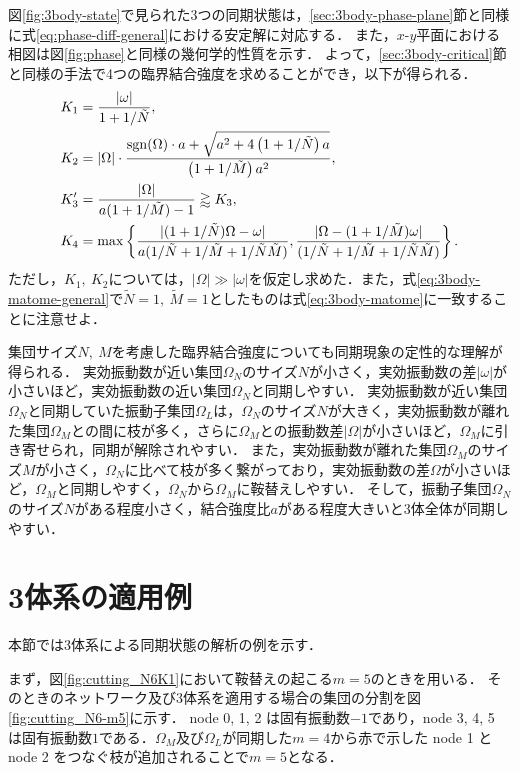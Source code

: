 \documentclass[../main]{subfiles}
\begin{document}
図\ref{fig:3body-state}で見られた3つの同期状態は，\ref{sec:3body-phase-plane}節と同様に式\eqref{eq:phase-diff-general}における安定解に対応する．
また，$x$-$y$平面における相図は図\ref{fig:phase}と同様の幾何学的性質を示す．
よって，\ref{sec:3body-critical}節と同様の手法で4つの臨界結合強度を求めることができ，以下が得られる．
\begin{align}
    \label{eq:3body-matome-general}
    \begin{split}
        K_1&=\frac{|\omega|}{1+1/\tilde{N}},\\
        K_2&=|\Omega|\cdot\frac{\operatorname{sgn}(\Omega) \cdot a+\sqrt{a^2+4\left(1+1/\tilde{N}\right)a}}{\left(1+1/\tilde{M}\right)a^2},\\
        K'_3&=\frac{|\Omega|}{a(1+1/\tilde{M})-1}\gtrapprox K_3,\\
        K_4&=\max\left\{\frac{|(1+1/\tilde{N})\Omega-\omega|}{a(1/\tilde{N}+1/\tilde{M}+1/\tilde{N}\tilde{M})},\frac{|\Omega-(1+1/\tilde{M})\omega|}{(1/\tilde{N}+1/\tilde{M}+1/\tilde{N}\tilde{M})}\right\}.
    \end{split}
\end{align}
ただし，$K_1,\ K_2$については，$|\Omega|\gg|\omega|$を仮定し求めた．また，式\eqref{eq:3body-matome-general}で$\tilde{N}=1,\ \tilde{M}=1$としたものは式\eqref{eq:3body-matome}に一致することに注意せよ．

集団サイズ$N,\ M$を考慮した臨界結合強度についても同期現象の定性的な理解が得られる．
実効振動数が近い集団$\Omega_N$のサイズ$N$が小さく，実効振動数の差$|\omega|$が小さいほど，実効振動数の近い集団$\Omega_N$と同期しやすい．
実効振動数が近い集団$\Omega_N$と同期していた振動子集団$\Omega_L$は，$\Omega_N$のサイズ$N$が大きく，実効振動数が離れた集団$\Omega_M$との間に枝が多く，さらに$\Omega_M$との振動数差$|\Omega|$が小さいほど，$\Omega_M$に引き寄せられ，同期が解除されやすい．
また，実効振動数が離れた集団$\Omega_M$のサイズ$M$が小さく，$\Omega_N$に比べて枝が多く繋がっており，実効振動数の差$\Omega$が小さいほど，$\Omega_M$と同期しやすく，$\Omega_N$から$\Omega_M$に鞍替えしやすい．
そして，振動子集団$\Omega_N$のサイズ$N$がある程度小さく，結合強度比$a$がある程度大きいと3体全体が同期しやすい．

\section{3体系の適用例}
本節では3体系による同期状態の解析の例を示す．

まず，図\ref{fig:cutting_N6K1}において鞍替えの起こる$m=5$のときを用いる．
そのときのネットワーク及び3体系を適用する場合の集団の分割を図\ref{fig:cutting_N6-m5}に示す．
node 0, 1, 2 は固有振動数$-1$であり，node 3, 4, 5 は固有振動数$1$である．$\Omega_M$及び$\Omega_L$が同期した$m=4$から赤で示した node 1 と node 2 をつなぐ枝が追加されることで$m=5$となる．
\end{document}
